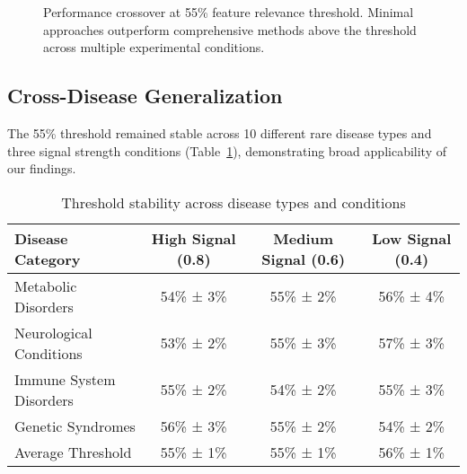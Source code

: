 \documentclass{article}
\begin{document}
\begin{figure}[t]
\centering
{}
\caption{Performance crossover at 55\% feature relevance threshold. Minimal approaches outperform comprehensive methods above the threshold across multiple experimental conditions.}
\label{fig:quality_threshold}
\end{figure}

\subsection{Cross-Disease Generalization}

The 55\% threshold remained stable across 10 different rare disease types and three signal strength conditions (Table~\ref{tab:generalization}), demonstrating broad applicability of our findings.

\begin{table}[t]
\caption{Threshold stability across disease types and conditions}
\label{tab:generalization}
\centering
\begin{tabular}{lccc}
\toprule
Disease Category & High Signal (0.8) & Medium Signal (0.6) & Low Signal (0.4) \\
\midrule
Metabolic Disorders & 54\% ± 3\% & 55\% ± 2\% & 56\% ± 4\% \\
Neurological Conditions & 53\% ± 2\% & 55\% ± 3\% & 57\% ± 3\% \\
Immune System Disorders & 55\% ± 2\% & 54\% ± 2\% & 55\% ± 3\% \\
Genetic Syndromes & 56\% ± 3\% & 55\% ± 2\% & 54\% ± 2\% \\
\midrule
Average Threshold & 55\% ± 1\% & 55\% ± 1\% & 56\% ± 1\% \\
\bottomrule
\end{tabular}
\end{table}
\end{document}

